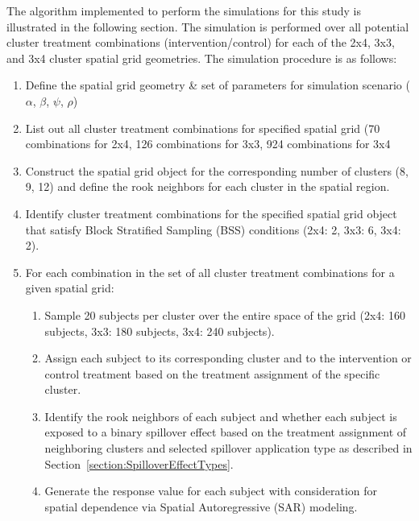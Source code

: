 \documentclass{article}[11pt]
\begin{document}
The algorithm implemented to perform the simulations for this study is illustrated in the following section. The simulation is performed over all potential cluster treatment combinations (intervention/control) for each of the 2x4, 3x3, and 3x4 cluster spatial grid geometries. The simulation procedure is as follows:

\begin{enumerate}
    \item\label{DefineSpatialGeometry} Define the spatial grid geometry \& set of parameters for simulation scenario ($\alpha$, $\beta$, $\psi$, $\rho$)

    \item List out all cluster treatment combinations for specified spatial grid (70 combinations for 2x4, 126 combinations for 3x3, 924 combinations for 3x4

    \item Construct the spatial grid object for the corresponding number of clusters (8, 9, 12) and define the rook neighbors for each cluster in the spatial region.

    \item Identify cluster treatment combinations for the specified spatial grid object that satisfy Block Stratified Sampling (BSS) conditions (2x4: 2, 3x3: 6, 3x4: 2).

    \item\label{SimulationProcedure} For each combination in the set of all cluster treatment combinations for a given spatial grid:

    \begin{enumerate}
        \item Sample 20 subjects per cluster over the entire space of the grid (2x4: 160 subjects, 3x3: 180 subjects, 3x4: 240 subjects).

        \item Assign each subject to its corresponding cluster and to the intervention or control treatment based on the treatment assignment of the specific cluster.

        \item Identify the rook neighbors of each subject and whether each subject is exposed to a binary spillover effect based on the treatment assignment of neighboring clusters and selected spillover application type as described in Section~\ref{section:SpilloverEffectTypes}.

        \item Generate the response value for each subject with consideration for spatial dependence via Spatial Autoregressive (SAR) modeling.


\end{enumerate}
\end{enumerate}
\end{document}
